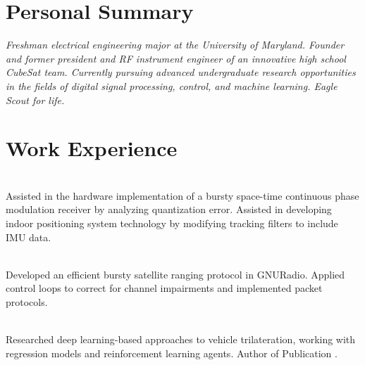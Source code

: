 \documentclass[]{deedy-resume-openfont}
\begin{document}
\begin{minipage}[t]{0.66\textwidth} 

\section{Personal Summary}

\textit{Freshman electrical engineering major at the University of Maryland. Founder and former president and RF instrument engineer of an innovative high school CubeSat team. Currently pursuing advanced undergraduate research opportunities in the fields of digital signal processing, control, and machine learning. Eagle Scout for life.}

\sectionsep
\section{Work Experience}

\vspace{0.125cm}

 \\
Assisted in the hardware implementation of a bursty space-time continuous phase modulation receiver by analyzing quantization error. Assisted in developing indoor positioning system technology by modifying tracking filters to include IMU data.
\sectionsep

 \\
Developed an efficient bursty satellite ranging protocol in GNURadio. Applied control loops to correct for channel impairments and implemented packet protocols.
\sectionsep

 \\
Researched deep learning-based approaches to vehicle trilateration, working with regression models and reinforcement learning agents. Author of Publication \cite{lps}.

\sectionsep


\end{minipage}
\end{document}
